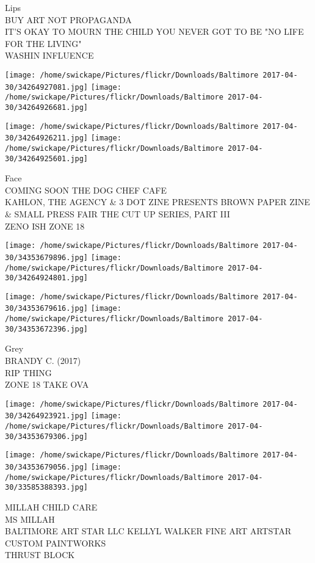 \documentclass[10pt,letterpaper]{article}
\begin{document}
Lips\\
BUY ART NOT PROPAGANDA\\
IT'S OKAY TO MOURN THE CHILD YOU NEVER GOT TO BE "NO LIFE FOR THE LIVING"\\
WASHIN INFLUENCE
\pagebreak

\texttt{[image: /home/swickape/Pictures/flickr/Downloads/Baltimore 2017-04-30/34264927081.jpg]}
\texttt{[image: /home/swickape/Pictures/flickr/Downloads/Baltimore 2017-04-30/34264926681.jpg]}

\texttt{[image: /home/swickape/Pictures/flickr/Downloads/Baltimore 2017-04-30/34264926211.jpg]}
\texttt{[image: /home/swickape/Pictures/flickr/Downloads/Baltimore 2017-04-30/34264925601.jpg]}

Face\\
COMING SOON THE DOG CHEF CAFE\\
KAHLON, THE AGENCY \& 3 DOT ZINE PRESENTS BROWN PAPER ZINE \& SMALL PRESS FAIR THE CUT UP SERIES, PART III\\
ZENO ISH ZONE 18
\pagebreak

\texttt{[image: /home/swickape/Pictures/flickr/Downloads/Baltimore 2017-04-30/34353679896.jpg]}
\texttt{[image: /home/swickape/Pictures/flickr/Downloads/Baltimore 2017-04-30/34264924801.jpg]}

\texttt{[image: /home/swickape/Pictures/flickr/Downloads/Baltimore 2017-04-30/34353679616.jpg]}
\texttt{[image: /home/swickape/Pictures/flickr/Downloads/Baltimore 2017-04-30/34353672396.jpg]}

Grey\\
BRANDY C. (2017)\\
RIP THING\\
ZONE 18 TAKE OVA
\pagebreak

\texttt{[image: /home/swickape/Pictures/flickr/Downloads/Baltimore 2017-04-30/34264923921.jpg]}
\texttt{[image: /home/swickape/Pictures/flickr/Downloads/Baltimore 2017-04-30/34353679306.jpg]}

\texttt{[image: /home/swickape/Pictures/flickr/Downloads/Baltimore 2017-04-30/34353679056.jpg]}
\texttt{[image: /home/swickape/Pictures/flickr/Downloads/Baltimore 2017-04-30/33585388393.jpg]}

MILLAH CHILD CARE\\
MS MILLAH\\
BALTIMORE ART STAR LLC KELLYL WALKER FINE ART ARTSTAR CUSTOM PAINTWORKS\\
THRUST BLOCK
\pagebreak
\end{document}
